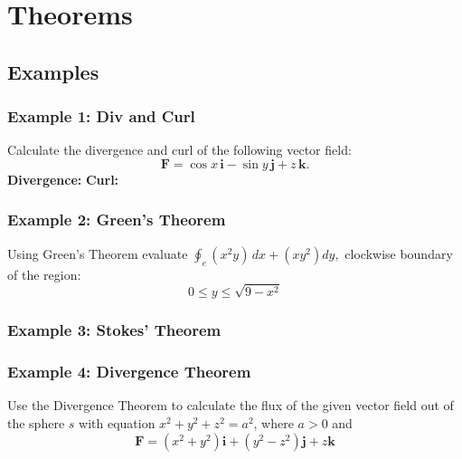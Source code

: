 \section{Theorems}

\subsection{Examples}
\subsubsection{Example 1: Div and Curl}
Calculate the divergence and curl of the following vector field:
$$\mathbf{F}=\cos x\,\mathbf{i}-\sin y\,\mathbf{j}+z\,\mathbf{k}.$$
\textbf{Divergence:}
\textbf{Curl:}

\subsubsection{Example 2: Green's Theorem}
Using Green's Theorem evaluate $\oint_{e}(x^{2}y)\,d x+(x y^{2})d y,$ clockwise boundary of the region:
$$0\leq y\leq{\sqrt{9-x^{2}}}$$

\subsubsection{Example 3: Stokes' Theorem}
\subsubsection{Example 4: Divergence Theorem}
Use the Divergence Theorem to calculate the flux of the given vector field out
of the sphere $s$ with equation $x^2 + y^2 + z^2 = a^2$, where $a > 0$ and
$$\mathbf{F}=(x^{2}+y^{2})\mathbf{i}+(y^{2}-z^{2})\mathbf{j}+z\mathbf{k}$$
